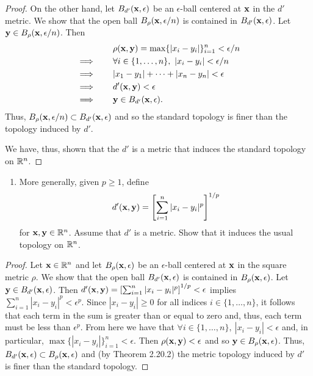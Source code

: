 \begin{solution}
\begin{proof}
        On the other hand, let $B_{d'}(\mathbf{x}, \epsilon)$ be an $\epsilon$-ball centered at $\mathbf{x}$ in the $d'$ metric.
        We show that the open ball $B_\rho(\mathbf{x}, \epsilon/n)$ is contained in $B_{d'}(\mathbf{x}, \epsilon)$.
        Let $\mathbf{y} \in B_\rho(\mathbf{x}, \epsilon/n)$.
        Then
        \begin{align*}
                            & \rho(\mathbf{x}, \mathbf{y})  = \max\{|x_i - y_i|\}_{i=1}^n < \epsilon / n \\
            \implies\qquad  & \forall i \in \{1, \ldots, n\},~ |x_i - y_i| < \epsilon / n \\
            \implies\qquad  & |x_1 - y_1| + \cdots + |x_n - y_n| < \epsilon \\
            \implies\qquad  & d'(\mathbf{x}, \mathbf{y}) < \epsilon \\
            \implies\qquad  & \mathbf{y} \in B_{d'}(\mathbf{x}, \epsilon).
        \end{align*}
        Thus, $B_\rho(\mathbf{x}, \epsilon / n) \subset B_{d'}(\mathbf{x}, \epsilon)$ and so the standard topology is finer than the topology induced by $d'$.

        We have, thus, shown that the $d'$ is a metric that induces the standard topology on $\mathbb{R}^n$.
    \end{proof}
    \bigskip

    \begin{enumerate}[label={(\alph*)}, align=left, leftmargin=\parindent, listparindent=\parindent, labelwidth=0pt, itemindent=!]
        \addtocounter{enumi}{1} 
         \item  More generally, given $p \geq 1$, define
         \begin{equation*}
             d'(\mathbf{x}, \mathbf{y}) = \left[\sum_{i=1}^n |x_i - y_i|^p\right]^{1/p}
         \end{equation*}
         for $\mathbf{x}, \mathbf{y} \in \mathbb{R}^n$.
         Assume that $d'$ is a metric.
         Show that it induces the usual topology on $\mathbb{R}^n$.
    \end{enumerate}
    \begin{proof}
        Let $\mathbf{x} \in \mathbb{R}^n$ and let $B_\rho(\mathbf{x}, \epsilon)$ be an $\epsilon$-ball centered at $\mathbf{x}$ in the square metric $\rho$.
        We show that the open ball $B_{d'}(\mathbf{x}, \epsilon)$ is contained in $B_\rho(\mathbf{x}, \epsilon)$.
        Let $\mathbf{y} \in B_{d'}(\mathbf{x}, \epsilon)$.
        Then $d'(\mathbf{x}, \mathbf{y}) = \left[\sum_{i=1}^n |x_i - y_i|^p\right]^{1/p} < \epsilon$ implies $\sum_{i=1}^n |x_i - y_i|^p < \epsilon^p$.
        Since $|x_i - y_i| \geq 0$ for all indices $i \in \{1, \ldots, n\}$, it follows that each term in the sum is greater than or equal to zero and, thus, each term must be less than $\epsilon^p$.
        From here we have that $\forall i \in \{1, \ldots, n\},~ |x_i - y_i| < \epsilon$ and, in particular, $\max \{|x_i - y_i|\}_{i=1}^n < \epsilon$. 
        Then $\rho(\mathbf{x}, \mathbf{y}) < \epsilon$ and so $\mathbf{y} \in B_\rho(\mathbf{x}, \epsilon)$.
        Thus, $B_{d'}(\mathbf{x}, \epsilon) \subset B_\rho(\mathbf{x}, \epsilon)$ and (by Theorem 2.20.2) the metric topology induced by $d'$ is finer than the standard topology.


\end{proof}
\end{solution}
